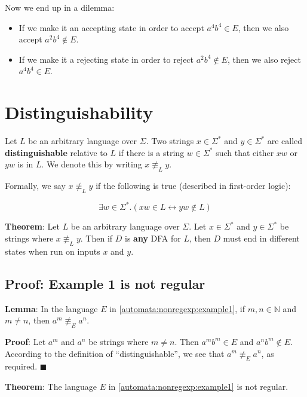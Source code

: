 \documentclass[12pt, letterpaper, oneside]{book}
\begin{document}
Now we end up in a dilemma:
\begin{itemize}
  \item If we make it an accepting state in order to accept $a^4b^4 \in E$, then we also accept $a^2b^4 \notin E$.
  \item If we make it a rejecting state in order to reject $a^2b^4 \notin E$, then we also reject $a^4b^4 \in E$.
\end{itemize}

\section{Distinguishability}

Let $L$ be an arbitrary language over $\Sigma$. Two strings $x \in \Sigma^*$ and $y \in \Sigma^*$ are called
\textbf{distinguishable} relative to $L$ if there is a string $w \in \Sigma^*$ such that either $xw$ or $yw$ is in $L$.
We denote this by writing $x \not\equiv_L y$.

Formally, we say $x \not\equiv_L y$ if the following is true (described in first-order logic):

\[ \exists w \in \Sigma^*. (xw \in L \leftrightarrow yw \notin L) \]

\textbf{Theorem}: Let $L$ be an arbitrary language over $\Sigma$. Let $x \in \Sigma^*$ and $y \in \Sigma^*$ be strings
where $x \not\equiv_L y$. Then if $D$ is \textbf{any} DFA for $L$, then $D$ must end in different states when run on
inputs $x$ and $y$.

\subsection{Proof: Example 1 is not regular}

\textbf{Lemma}: In the language $E$ in \ref{automata:nonregexp:example1}, if $m, n \in \mathbb{N}$ and $m \neq n$, then
$a^m \not\equiv_E a^n$.

\textbf{Proof}: Let $a^m$ and $a^n$ be strings where $m \neq n$. Then $a^mb^m \in E$ and $a^nb^m \notin E$. According
to the definition of ``distinguishable'', we see that $a^m \not\equiv_E a^n$, as required. $\blacksquare$

\textbf{Theorem}: The language $E$ in \ref{automata:nonregexp:example1} is not regular.
\end{document}
